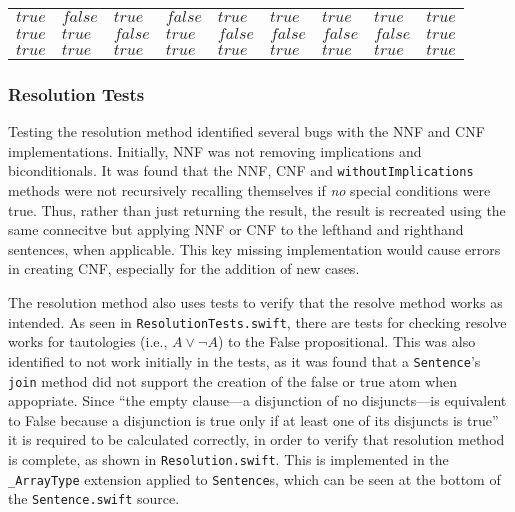 \begin{sidewaystable}
\begin{tabular}{l|l|l||l|l|l|l|l|l}
    \underline{$true$}                & $false$                          & $true$                           & $false$                      & $true$                            & $true$                            & $true$                           & $true$                      & $true$                                 \\
    \underline{$true$}                & $true$                           & $false$                          & $true$                       & $false$                           & $false$                           & $false$                          & $false$                     & $true$                                 \\
    \underline{$true$}                & $true$                           & $true$                           & $true$                       & $true$                            & $true$                            & $true$                           & $true$                      & $true$                                 \\ \hline
    \end{tabular}
\end{sidewaystable}

\subsubsection{Resolution Tests}
\label{subs:Resolution Tests}

Testing the resolution method identified several bugs with the NNF and CNF implementations.
Initially, NNF was not removing implications and biconditionals. It was found that
the NNF, CNF and \texttt{withoutImplications} methods were not recursively recalling
themselves if \emph{no} special conditions were true. Thus, rather than just
returning the result, the result is recreated using the same connecitve but applying
NNF or CNF to the lefthand and righthand sentences, when applicable. This key missing
implementation would cause errors in creating CNF, especially for the addition of
new cases.

The resolution method also uses tests to verify that the resolve method works as
intended. As seen in \texttt{ResolutionTests.swift}, there are tests for checking
resolve works for tautologies (i.e., $A \vee \neg A$) to the False propositional.
This was also identified to not work initially in the tests, as it was found that
a \texttt{Sentence}'s \texttt{join} method did not support the creation of the
false or true atom when appopriate. Since ``the empty clause—a disjunction of no disjuncts—is equivalent to False because a disjunction is true only if at least one of its disjuncts is true'' \citep[p.254]{aima2009}
it is required to be calculated correctly, in order to verify that resolution
method is complete, as shown in \texttt{Resolution.swift}. This is implemented
in the \texttt{\_ArrayType} extension applied to \texttt{Sentence}s, which can
be seen at the bottom of the \texttt{Sentence.swift} source.
